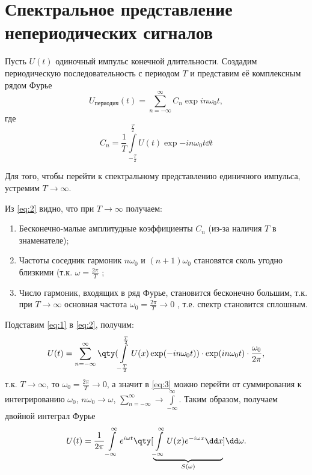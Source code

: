 \documentclass[a4paper,14pt]{extarticle}
\begin{document}
\section{Спектральное представление непериодических сигналов}%
Пусть $U(t)$ одиночный импульс конечной длительности. Создадим периодическую
последовательность с периодом $T$ и представим её комплексным рядом Фурье
\begin{equation}
    \label{eq:1}
    U_{\text{периодич} } (t) = \sum\limits_{n=-\infty}^{\infty} C_n \exp{ i n \omega_0 t},
\end{equation}
где 
\begin{equation}
    \label{eq:2}
    C_n =\frac{1}{T} \int\limits_{- \frac{T}{2}}^{\frac{T}{2}} U(t) \exp{-in\omega_{0}t } \dd t
\end{equation}

Для того, чтобы перейти к спектральному представлению единичного импульса, устремим $T \to  \infty$.

Из \eqref{eq:2} видно, что при $T \to \infty$ получаем:
\begin{enumerate}
    \item Бесконечно-малые амплитудные коэффициенты $C_n$ (из-за наличия $T$ 
        в знаменателе);
    \item Частоты соседник гармоник $n \omega_{0}$ и $(n+1) \omega_{0}$ 
        становятся  сколь угодно близкими (т.к. $\omega=\frac{2\pi}{T}$ ;
    \item Число гармоник, входящих в ряд Фурье, становится бесконечно большим, т.к. при $T \to \infty$ основная частота $\omega_{0} = \frac{2 \pi}{T} \to 0$ ,
        т.е. спектр становится сплошным.
\end{enumerate}
Подставим \eqref{eq:1}  в \eqref{eq:2}, получим: 
\begin{equation}
    \label{eq:3}
    U(t) = \sum\limits_{n=-\infty}^{\infty} 
    \qty( 
    \int\limits_{- \frac{T}{2}}^{\frac{T}{2}} U(x) \exp(-in \omega_{0} t)
        )  
        \cdot \exp(in\omega_{0} t) \cdot \frac{\omega_{0}}{2 \pi},
\end{equation}
т.к. $T \to \infty $, то  $\omega_{0} = \frac{2\pi}{T} \to 0$, 
а значит в \eqref{eq:3}  можно перейти от суммирования к интегрированию 
$\omega_{0}$, $n \omega_{0} \to \omega$, 
$\sum\limits_{n=-\infty}^{\infty} \to \int\limits_{-\infty}^{\infty}  $. 
Таким образом, получаем двойной интеграл Фурье
\begin{equation}
    \label{eq:5}
    U(t) = \frac{1}{2 \pi} \int\limits_{-\infty}^{\infty} e^{i \omega t} 
    \qty[ 
    \underbrace{ 
    \int\limits_{-\infty}^{\infty} U(x) e^{- i \omega x} \dd x
}_{S(\omega)}
        ] \dd \omega.
\end{equation}
\end{document}
